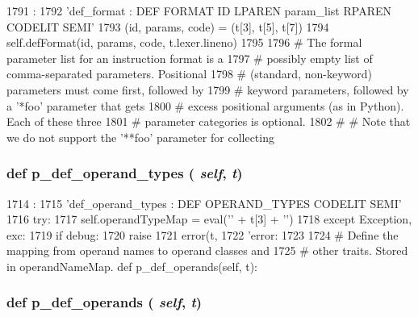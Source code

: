 \begin{DoxyCode}
1791                              :
1792         'def_format : DEF FORMAT ID LPAREN param_list RPAREN CODELIT SEMI'
1793         (id, params, code) = (t[3], t[5], t[7])
1794         self.defFormat(id, params, code, t.lexer.lineno)
1795 
1796     # The formal parameter list for an instruction format is a
1797     # possibly empty list of comma-separated parameters.  Positional
1798     # (standard, non-keyword) parameters must come first, followed by
1799     # keyword parameters, followed by a '*foo' parameter that gets
1800     # excess positional arguments (as in Python).  Each of these three
1801     # parameter categories is optional.
1802     #
    # Note that we do not support the '**foo' parameter for collecting
\end{DoxyCode}
\hypertarget{classisa__parser_1_1ISAParser_a8ccd4be07d1f45274f007765fff0f0ea}{
\subsubsection[{p\_\-def\_\-operand\_\-types}]{\setlength{\rightskip}{0pt plus 5cm}def p\_\-def\_\-operand\_\-types ( {\em self}, \/   {\em t})}}
\label{classisa__parser_1_1ISAParser_a8ccd4be07d1f45274f007765fff0f0ea}



\begin{DoxyCode}
1714                                     :
1715         'def_operand_types : DEF OPERAND_TYPES CODELIT SEMI'
1716         try:
1717             self.operandTypeMap = eval('{' + t[3] + '}')
1718         except Exception, exc:
1719             if debug:
1720                 raise
1721             error(t,
1722                   'error: %
1723 
1724     # Define the mapping from operand names to operand classes and
1725     # other traits.  Stored in operandNameMap.
    def p_def_operands(self, t):
\end{DoxyCode}
\hypertarget{classisa__parser_1_1ISAParser_a614c3107873cf2c178233b051b8c48bc}{
\subsubsection[{p\_\-def\_\-operands}]{\setlength{\rightskip}{0pt plus 5cm}def p\_\-def\_\-operands ( {\em self}, \/   {\em t})}}
\label{classisa__parser_1_1ISAParser_a614c3107873cf2c178233b051b8c48bc}



